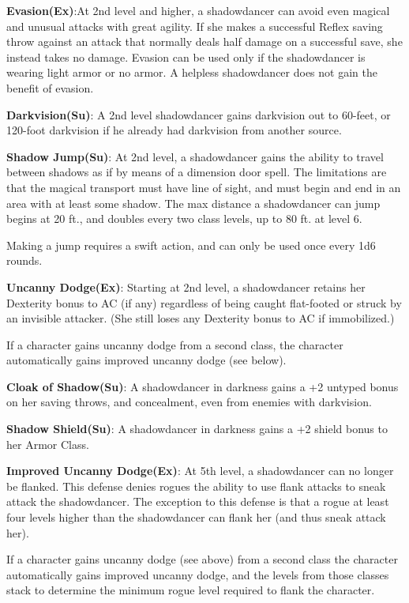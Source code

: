 \textbf{Evasion(Ex)}:At 2nd level and higher, a shadowdancer can avoid even magical and unusual attacks with great agility. If she makes a successful Reflex saving throw against an attack that normally deals half damage on a successful save, she instead takes no damage. Evasion can be used only if the shadowdancer is wearing light armor or no armor. A helpless shadowdancer does not gain the benefit of evasion.

\textbf{Darkvision(Su)}: A 2nd level shadowdancer gains darkvision out to 60-feet, or 120-foot darkvision if he already had darkvision from another source.

\textbf{Shadow Jump(Su)}: At 2nd level, a shadowdancer gains the ability to travel between shadows as if by means of a dimension door spell. The limitations are that the magical transport must have line of sight, and must begin and end in an area with at least some shadow. The max distance a shadowdancer can jump begins at 20 ft., and doubles every two class levels, up to 80 ft. at level 6.

Making a jump requires a swift action, and can only be used once every 1d6 rounds.

\textbf{Uncanny Dodge(Ex)}: Starting at 2nd level, a shadowdancer retains her Dexterity bonus to AC (if any) regardless of being caught flat-footed or struck by an invisible attacker. (She still loses any Dexterity bonus to AC if immobilized.)

If a character gains uncanny dodge from a second class, the character automatically gains improved uncanny dodge (see below).

\textbf{Cloak of Shadow(Su)}: A shadowdancer in darkness gains a +2 untyped bonus on her saving throws, and concealment, even from enemies with darkvision.

\textbf{Shadow Shield(Su)}: A shadowdancer in darkness gains a +2 shield bonus to her Armor Class.

\textbf{Improved Uncanny Dodge(Ex)}: At 5th level, a shadowdancer can no longer be flanked. This defense denies rogues the ability to use flank attacks to sneak attack the shadowdancer. The exception to this defense is that a rogue at least four levels higher than the shadowdancer can flank her (and thus sneak attack her).

If a character gains uncanny dodge (see above) from a second class the character automatically gains improved uncanny dodge, and the levels from those classes stack to determine the minimum rogue level required to flank the character.

